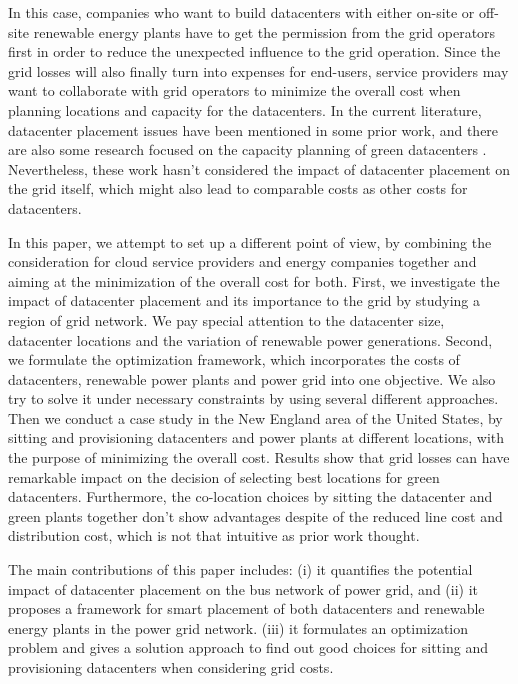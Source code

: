 In this case, companies who want to build datacenters with either on-site or off-site renewable energy plants have to get the permission from the grid operators first in order to reduce the unexpected influence to the grid operation. Since the grid losses will also finally turn into expenses for end-users, service providers may want to collaborate with grid operators to minimize the overall cost when planning locations and capacity for the datacenters. In the current literature, datacenter placement issues have been mentioned in some prior work\cite{Goiri11place,Dalger05,Boley09,larumbe2012optimal}, and there are also some research focused on the capacity planning of green datacenters \cite{Le10,berral2014building}. Nevertheless, these work hasn't considered the impact of datacenter placement on the grid itself, which might also lead to comparable costs as other costs for datacenters.

In this paper, we attempt to set up a different point of view, by combining the consideration for cloud service providers and energy companies together and aiming at the minimization of the overall cost for both. First, we investigate the impact of datacenter placement and its importance to the grid by studying a region of grid network. We pay special attention to the datacenter size, datacenter locations and the variation of renewable power generations. Second, we formulate the optimization framework, which incorporates the costs of datacenters, renewable power plants and power grid into one objective. We also try to solve it under necessary constraints by using several different approaches. Then we conduct a case study in the New England area of the United States, by sitting and provisioning datacenters and power plants at different locations, with the purpose of minimizing the overall cost. Results show that grid losses can have remarkable impact on the decision of selecting best locations for green datacenters. Furthermore, the co-location choices by sitting the datacenter and green plants together don't show advantages despite of the reduced line cost and distribution cost, which is not that intuitive as prior work thought.

 The main contributions of this paper includes: (i) it quantifies the potential impact of datacenter placement on the bus network of power grid, and (ii) it proposes a framework for smart placement of both datacenters and renewable energy plants in the power grid network. (iii) it formulates an optimization problem and gives a solution approach to find out good choices for sitting and provisioning datacenters when considering grid costs.

